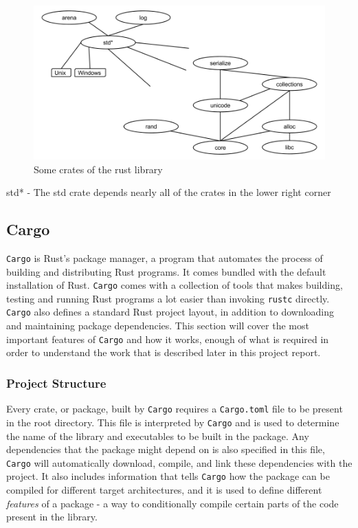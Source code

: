 \begin{figure}[H]
  \begin{center}
    \includegraphics[scale=0.3]{figures/background/rust/rust-lib.png}
  \end{center}
  \caption{Some crates of the rust library}
  \label{fig:rust:librust}
\end{figure}
std* - The std crate depends nearly all of the crates in the lower right corner

\subsection{Cargo}
\label{sec:cargo}

\texttt{Cargo} is Rust's package manager, a program that automates the process of building and distributing Rust programs.
It comes bundled with the default installation of Rust.
\texttt{Cargo} comes with a collection of tools that makes building, testing and running Rust programs a lot easier than invoking \texttt{rustc} directly.
\texttt{Cargo} also defines a standard Rust project layout, in addition to downloading and maintaining package dependencies.
This section will cover the most important features of \texttt{Cargo} and how it works, enough of what is required in order to understand the work that is described later in this project report.

\subsubsection{Project Structure}
\label{ssub:project_structure}

Every crate, or package, built by \texttt{Cargo} requires a \texttt{Cargo.toml} file to be present in the root directory.
This file is interpreted by \texttt{Cargo} and is used to determine the name of the library and executables to be built in the package.
Any dependencies that the package might depend on is also specified in this file, \texttt{Cargo} will automatically download, compile, and link these dependencies with the project.
It also includes information that tells \texttt{Cargo} how the package can be compiled for different target architectures, and it is used to define different \textit{features} of a package - a way to conditionally compile certain parts of the code present in the library.

